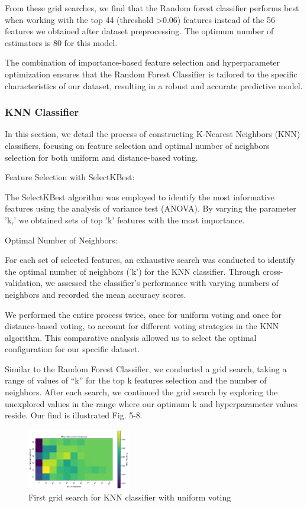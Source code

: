 \documentclass[journal,comsoc]{IEEEtran}
\begin{document}
From these grid searches, we find that the Random forest classifier performs best when working with the top 44 (threshold \textgreater 0.06) features instead of the 56 features we obtained after dataset preprocessing. The optimum number of estimators is 80 for this model.

The combination of importance-based feature selection and hyperparameter optimization ensures that the Random Forest Classifier is tailored to the specific characteristics of our dataset, resulting in a robust and accurate predictive model.

\subsubsection{KNN Classifier}
In this section, we detail the process of constructing K-Nearest Neighbors (KNN) classifiers, focusing on feature selection and optimal number of neighbors selection for both uniform and distance-based voting.

Feature Selection with SelectKBest:

The SelectKBest algorithm was employed to identify the most informative features using the analysis of variance test (ANOVA). By varying the parameter 'k,' we obtained sets of top 'k' features with the most importance.

Optimal Number of Neighbors:

For each set of selected features, an exhaustive search was conducted to identify the optimal number of neighbors ('k') for the KNN classifier. Through cross-validation, we assessed the classifier's performance with varying numbers of neighbors and recorded the mean accuracy scores.

We performed the entire process twice, once for uniform voting and once for distance-based voting, to account for different voting strategies in the KNN algorithm. This comparative analysis allowed us to select the optimal configuration for our specific dataset.

Similar to the Random Forest Classifier, we conducted a grid search, taking a range of values of “k” for the top k features selection and the number of neighbors. After each search, we continued the grid search by exploring the unexplored values in the range where our optimum k and hyperparameter values reside. Our find is illustrated Fig. 5-8.

\begin{figure}[H]
  \centering
  \includegraphics[width=0.4\textwidth]{knn1.png}
  \captionsetup{font=small} %
  \caption{First grid search for KNN classifier with uniform voting}
  \label{fig:knn1}
\end{figure}
\vspace{-20pt} 
\end{document}
